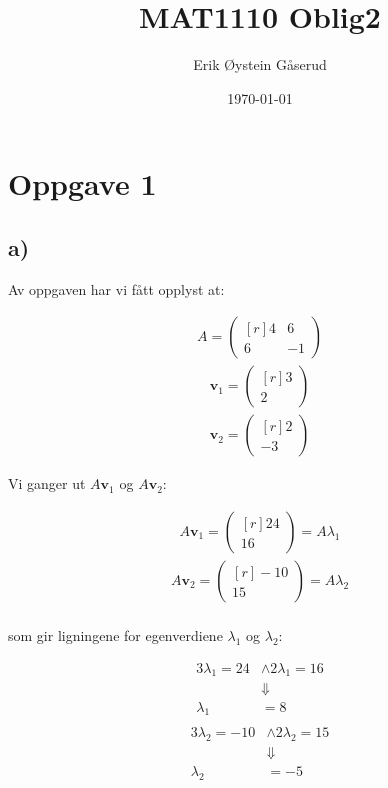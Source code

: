 \documentclass[11pt]{article}
\title{MAT1110 Oblig2}
\author{Erik Øystein Gåserud}
\date{\today}
\renewcommand{\vec}[1]{\mathbf{#1}}
\newcommand{\bpm}{\begin{pmatrix*}[r]}
\newcommand{\epm}{\end{pmatrix*}}
\begin{document}
	\maketitle
	\section*{Oppgave 1}
	\subsection*{a)}
	Av oppgaven har vi fått opplyst at:
		\begin{multicols}{3} \noindent
			\begin{align*}
				A = \bpm 4 & 6 \\ 6 & -1 \epm
			\end{align*}
			\begin{align*}
				\vec{v}_{1} = \bpm 3 \\ 2 \epm
			\end{align*}
			\begin{align*}
				\vec{v}_{2} = \bpm 2 \\ -3 \epm
			\end{align*}
		\end{multicols}
	Vi ganger ut $A\vec{v}_{1}$ og $A\vec{v}_{2}$:
		\begin{multicols}{2} \noindent
			\begin{align*}
				A\vec{v}_{1} = \bpm 24 \\ 16 \epm = A\lambda_{1}
			\end{align*}
			\begin{align*}
				A\vec{v}_{2} = \bpm -10 \\ 15 \epm = A\lambda_{2}\\
			\end{align*}
		\end{multicols}
		som gir ligningene for egenverdiene $\lambda_{1}$ og $\lambda_{2}$:
		\begin{multicols}{2} \noindent
			\begin{align*}
				3\lambda_{1} = 24&\wedge2\lambda_{1} = 16 \\
				&\Downarrow \\
				\lambda_{1} &= 8 \\
			\end{align*}
			\begin{align*}
				3\lambda_{2} = -10&\wedge2\lambda_{2} = 15 \\
				&\Downarrow \\
				\lambda_{2} &= -5\\
			\end{align*}
		\end{multicols}
\end{document}
